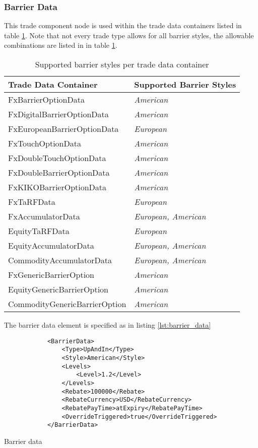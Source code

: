 \subsubsection{Barrier Data}
\label{ss:barrier_data} 

This trade component node is used within the trade data containers listed in table \ref{tab:barrierstyles}. Note that not
every trade type allows for all barrier styles, the allowable combinations are listed in in table \ref{tab:barrierstyles}.

\begin{table}
  \centering
  \begin{tabular}{l | l}
    Trade Data Container & Supported Barrier Styles \\ \hline
    FxBarrierOptionData & \emph{American} \\
    FxDigitalBarrierOptionData & \emph{American} \\
    FxEuropeanBarrierOptionData & \emph{European} \\
    FxTouchOptionData & \emph{American} \\
    FxDoubleTouchOptionData & \emph{American} \\
    FxDoubleBarrierOptionData & \emph{American} \\
    FxKIKOBarrierOptionData & \emph{American} \\
    FxTaRFData & \emph{European} \\
    FxAccumulatorData & \emph{European, American} \\
    EquityTaRFData & \emph{European} \\
    EquityAccumulatorData & \emph{European, American} \\
    CommodityAccumulatorData & \emph{European, American} \\
    FxGenericBarrierOption & \emph{American} \\
    EquityGenericBarrierOption & \emph{American} \\
    CommodityGenericBarrierOption & \emph{American}
\end{tabular}
  \caption{Supported barrier styles per trade data container}
  \label{tab:barrierstyles}
\end{table}

The barrier data element is specified as in listing \ref{lst:barrier_data}

\begin{listing}[H]
\begin{verbatim}
            <BarrierData>
                <Type>UpAndIn</Type>
                <Style>American</Style>
                <Levels>
                    <Level>1.2</Level>
                </Levels>
                <Rebate>100000</Rebate>
                <RebateCurrency>USD</RebateCurrency>
                <RebatePayTime>atExpiry</RebatePayTime>
                <OverrideTriggered>true</OverrideTriggered>
            </BarrierData>
\end{verbatim}
\caption{Barrier data}
\label{lst:barrier_data}
\end{listing}

